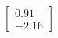 \documentclass[preview]{standalone}
\begin{document}
\begin{align*}
\begin{bmatrix} 0.91 \\ -2.16 \end{bmatrix}
\end{align*}
\end{document}
